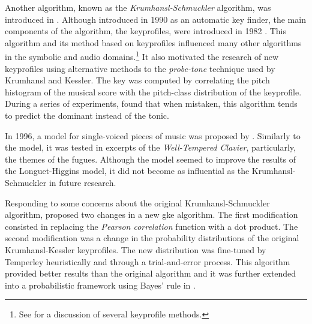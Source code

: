 Another algorithm, known as the \emph{Krumhansl-Schmuckler}
algorithm, was introduced in
\textcite{krumhansl1990cognitive}. Although introduced in
1990 as an automatic key finder, the main components of the
algorithm, the \gls{keyprofile}s, were introduced in 1982
\parencite{krumhansl1982tracing}. This algorithm and its
method based on \gls{keyprofile}s influenced many other
algorithms in the symbolic and audio domains.\footnote{See
\textcite{napoleslopez2019keyfinding} for a discussion of
several \gls{keyprofile} methods.} It also motivated the
research of new \gls{keyprofile}s using alternative methods
to the \emph{probe-tone} technique used by Krumhansl and
Kessler. The key was computed by correlating the pitch
histogram of the musical score with the pitch-class
distribution of the \gls{keyprofile}. During a series of
experiments, \textcite{sapp2011computational} found that
when mistaken, this algorithm tends to predict the dominant
instead of the tonic.

In 1996, a model for single-voiced pieces of music was
proposed by \textcite{vos1996parallelprocessing}. Similarly
to the \textcite{longuethiggins1971interpreting} model, it
was tested in excerpts of the \emph{Well-Tempered Clavier},
particularly, the themes of the fugues. Although the model
seemed to improve the results of the Longuet-Higgins model,
it did not become as influential as the Krumhansl-Schmuckler
in future research.

Responding to some concerns about the original
Krumhansl-Schmuckler algorithm,
\textcite{temperley1999whats} proposed two changes in a new
\gls{gke} algorithm. The first modification consisted in
replacing the \emph{Pearson correlation} function with a dot
product. The second modification was a change in the
probability distributions of the original Krumhansl-Kessler
\gls{keyprofile}s. The new distribution was fine-tuned by
Temperley heuristically and through a trial-and-error
process. This algorithm provided better results than the
original algorithm and it was further extended into a
probabilistic framework using Bayes' rule in
\textcite{temperley2002bayesian}.




